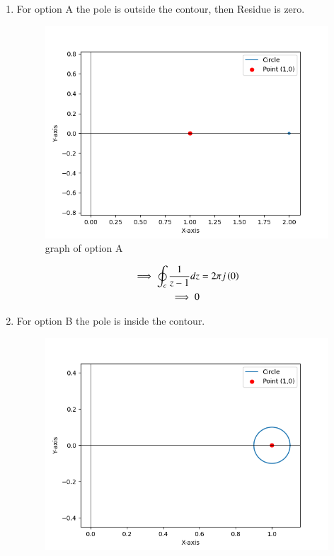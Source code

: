 \documentclass[journal,12pt,twocolumn]{IEEEtran}
\theoremstyle{remark}
\begin{document}
\begin{enumerate}
\item For option A the pole is outside the contour, then Residue is zero.\\
\begin{figure}[h!]
    \centering
    \includegraphics[width=1\columnwidth]{2023/BM/48/figs/plotg231.png}
    \caption{graph of option A}
\end{figure}
\begin{align}
\implies\oint_{c}\frac{1}{z-1}dz &=2\pi j\left(0\right)\\
\implies 0
\end{align}
\item For option B the pole is inside the contour.\\
\begin{figure}[h!]
    \centering
    \includegraphics[width=1\columnwidth]{2023/BM/48/figs/plotg232.png}

\end{figure}
\end{enumerate}
\end{document}
